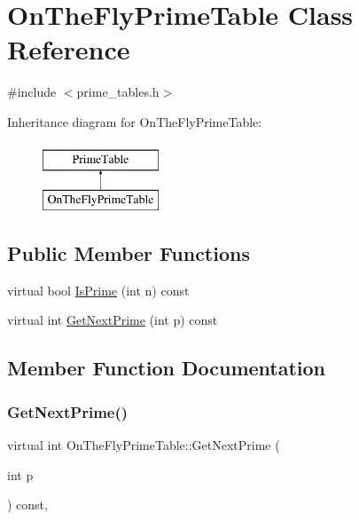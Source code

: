 \hypertarget{classOnTheFlyPrimeTable}{}\section{On\+The\+Fly\+Prime\+Table Class Reference}
\label{classOnTheFlyPrimeTable}


{\ttfamily \#include $<$prime\+\_\+tables.\+h$>$}

Inheritance diagram for On\+The\+Fly\+Prime\+Table\+:\begin{figure}[H]
\begin{center}
\leavevmode
\includegraphics[height=2.000000cm]{classOnTheFlyPrimeTable}
\end{center}
\end{figure}
\subsection*{Public Member Functions}
\begin{DoxyCompactItemize}
\item 
virtual bool \mbox{\hyperlink{classOnTheFlyPrimeTable_a1d49b78f79e018441289e79d75680067}{Is\+Prime}} (int n) const
\item 
virtual int \mbox{\hyperlink{classOnTheFlyPrimeTable_a5a4644fedd95d33136723f33b9302bfc}{Get\+Next\+Prime}} (int p) const
\end{DoxyCompactItemize}


\subsection{Member Function Documentation}
\mbox{\label{classOnTheFlyPrimeTable_a5a4644fedd95d33136723f33b9302bfc}} 
\subsubsection{\texorpdfstring{GetNextPrime()}{GetNextPrime()}}
{\footnotesize\ttfamily virtual int On\+The\+Fly\+Prime\+Table\+::\+Get\+Next\+Prime (\begin{DoxyParamCaption}\item[{int}]{p }\end{DoxyParamCaption}) const\hspace{0.3cm}{\ttfamily [inline]}, {\ttfamily [virtual]}}



